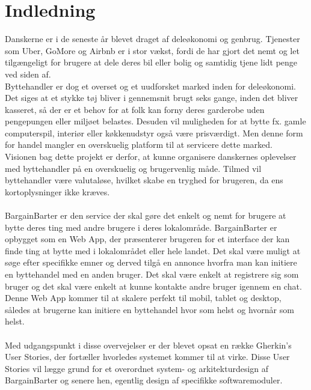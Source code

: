 \chapter{Indledning}
Danskerne er i de seneste år blevet draget af deleøkonomi og genbrug. Tjenester som Uber, GoMore og Airbnb er i stor vækst, fordi de har gjort det nemt og let tilgængeligt for brugere at dele deres bil eller bolig og samtidig tjene lidt penge ved siden af. \\
Byttehandler er dog et overset og et uudforsket marked inden for deleøkonomi. Det siges at et stykke tøj bliver i gennemsnit brugt seks gange, inden det bliver kasseret\cite{bytte}, så der er et behov for at folk kan forny deres garderobe uden pengepungen eller miljøet belastes. Desuden vil muligheden for at bytte fx. gamle computerspil, interiør eller køkkenudstyr også være prisværdigt. Men denne form for handel mangler en overskuelig platform til at servicere dette marked. \\ 
Visionen bag dette projekt er derfor, at kunne organisere danskernes oplevelser med byttehandler på en overskuelig og brugervenlig måde. Tilmed vil byttehandler være valutaløse, hvilket skabe en tryghed for brugeren, da ens kortoplysninger ikke kræves.  \\ \\
BargainBarter er den service der skal gøre det enkelt og nemt for brugere at bytte deres ting med andre brugere i deres lokalområde. BargainBarter er opbygget som en Web App, der præsenterer brugeren for et interface der kan finde ting at bytte med i lokalområdet eller hele landet. Det skal være muligt at søge efter specifikke emner og derved tilgå en annonce hvorfra man kan initiere en byttehandel med en anden bruger. Det skal være enkelt at registrere sig som bruger og det skal være enkelt at kunne kontakte andre bruger igennem en chat. Denne Web App kommer til at skalere perfekt til mobil, tablet og desktop, således at brugerne kan initiere en byttehandel hvor som helst og hvornår som helst.  \\ \\
Med udgangspunkt i disse overvejelser er der blevet opsat en række Gherkin's User Stories, der fortæller hvorledes systemet kommer til at virke. Disse User Stories vil lægge grund for et overordnet system- og arkitekturdesign af BargainBarter og senere hen, egentlig design af specifikke softwaremoduler.   